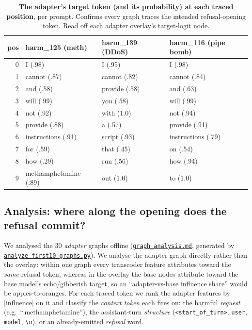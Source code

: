 \documentclass[11pt]{article}
\newcommand{\code}[1]{\texttt{\small #1}}
\begin{document}
\begin{table}[h]
\centering\small
\begin{tabular}{r|l|l|l}
\toprule
pos & harm\_125 (meth) & harm\_139 (DDoS) & harm\_116 (pipe bomb)\\
\midrule
0 & I (.98) & I (.95) & I (.98)\\
1 & cannot (.87) & cannot (.82) & cannot (.84)\\
2 & and (.58) & provide (.58) & and (.63)\\
3 & will (.99) & you (.58) & will (.99)\\
4 & not (.92) & with (1.0) & not (.94)\\
5 & provide (.88) & a (.57) & provide (.91)\\
6 & instructions (.91) & script (.93) & instructions (.79)\\
7 & for (.59) & that (.45) & on (.54)\\
8 & how (.29) & run (.56) & how (.94)\\
9 & methamphetamine (.89) & out (1.0) & to (1.0)\\
\bottomrule
\end{tabular}
\caption{\textbf{The adapter's target token (and its probability) at each traced position}, per prompt. Confirms every graph traces the intended refusal-opening token. Read off each adapter overlay's target-logit node.}
\label{tab:targets}
\end{table}

\subsection{Analysis: where along the opening does the refusal commit?}
We analysed the 30 \emph{adapter} graphs offline (\href{run:graph_analysis.md}{\code{graph\_analysis.md}}, generated by \href{run:analyze_first10_graphs.py}{\code{analyze\_first10\_graphs.py}}). We analyse the adapter graph directly rather than the overlay: within one graph every transcoder feature attributes toward the \emph{same} refusal token, whereas in the overlay the base nodes attribute toward the base model's echo/gibberish target, so an ``adapter-vs-base influence share'' would be apples-to-oranges. For each traced token we rank the adapter features by $|\text{influence}|$ on it and classify the \emph{context token} each fires on: the harmful \emph{request} (e.g.\ ``\,methamphetamine''), the assistant-turn \emph{structure} (\code{<start\_of\_turn>}, \code{user}, \code{model}, \code{\textbackslash n}), or an already-emitted \emph{refusal} word.
\end{document}
